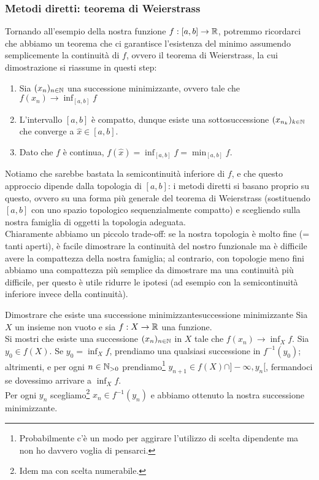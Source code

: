 \documentclass[openany]{book}
\begin{document}
\subsubsection*{Metodi diretti: teorema di Weierstrass}

Tornando all'esempio della nostra funzione $f:[a,b]\to \mathbb{R}$, potremmo ricordarci che abbiamo un teorema che ci garantisce l'esistenza del minimo assumendo semplicemente la continuità di $f$, ovvero il teorema di Weierstrass, la cui dimostrazione si riassume in questi step:\begin{enumerate}
    \item Sia $(x_n)_{n\in\mathbb{N}}$ una successione minimizzante, ovvero tale che $f(x_n)\to \inf_{[a,b]}f$
    \item L'intervallo $[a,b]$ è compatto, dunque esiste una sottosuccessione $(x_{n_k})_{k \in \mathbb{N}}$ che converge a $\hat{x} \in [a,b]$.
    \item Dato che $f$ è continua, $f(\hat{x}) = \inf_{[a,b]}f = \min_{[a,b]}f$.
\end{enumerate}
Notiamo che sarebbe bastata la semicontinuità inferiore di $f$, e che questo approccio dipende dalla topologia di $[a,b]$: i metodi diretti si basano proprio su questo, ovvero su una forma più generale del teorema di Weierstrass (sostituendo $[a,b]$ con uno spazio topologico sequenzialmente compatto) e scegliendo sulla nostra famiglia di oggetti la topologia adeguata.\\
Chiaramente abbiamo un piccolo trade-off: se la nostra topologia è molto fine (= tanti aperti), è facile dimostrare la continuità del nostro funzionale ma è difficile avere la compattezza della nostra famiglia; al contrario, con topologie meno fini abbiamo una compattezza più semplice da dimostrare ma una continuità più difficile, per questo è utile ridurre le ipotesi (ad esempio con la semicontinuità inferiore invece della continuità).

\begin{exercise}{Dimostrare che esiste una successione minimizzante}{successione minimizzante}
    Sia $X$ un insieme non vuoto e sia $f : X\to \mathbb{R}$ una funzione.\\
    Si mostri che esiste una successione $(x_n)_{n \in \mathbb{N}}$ in $X$ tale che $f(x_n)\to \inf_{X} f$.
    \solution 
    Sia $y_0 \in f(X)$. Se $y_0 = \inf_X f$, prendiamo una qualsiasi successione in $f^{-1}(y_0)$; altrimenti, e per ogni $n \in \mathbb{N}_{>0}$ prendiamo\footnote{Probabilmente c'è un modo per aggirare l'utilizzo di scelta dipendente ma non ho davvero voglia di pensarci.} $y_{n+1} \in f(X) \cap ]-\infty, y_n[$, fermandoci se dovessimo arrivare a $\inf_X f$.\\
    Per ogni $y_n$ scegliamo\footnote{Idem ma con scelta numerabile.} $x_n \in f^{-1}(y_n)$ e abbiamo ottenuto la nostra successione minimizzante.
    \solved
\end{exercise}
\end{document}
